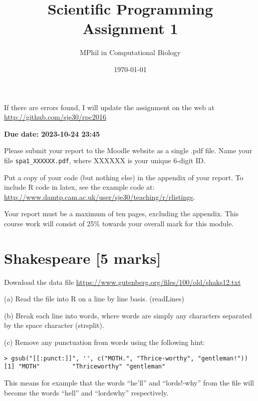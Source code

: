 \documentclass[11pt]{article}\usepackage[]{graphicx}\usepackage[]{color}
\newcommand{\hard}{\textbf{(Advanced:)}\xspace}
\begin{document}
\title{Scientific Programming Assignment 1}
\author{MPhil in Computational Biology}
\date{\today}

\maketitle


If there are errors found, I will update the assignment on the web at\\
\url{http://github.com/sje30/rpc2016}



\textbf{Due date: 2023-10-24 23:45}

Please submit your report to the Moodle website as a single .pdf
file.  Name your file \verb+spa1_XXXXXX.pdf+, where XXXXXX is your
unique 6-digit ID.

Put a copy of your code (but nothing else) in the appendix of your
report.  To include R code in latex, see the example code at:
\url{http://www.damtp.cam.ac.uk/user/sje30/teaching/r/rlistings}.

Your report must be a maximum of ten pages, excluding the appendix.
This course work will consist of 25\% towards your overall mark for
this module.  %





\clearpage


\section{Shakespeare [5 marks]}

Download the data file \url{https://www.gutenberg.org/files/100/old/shaks12.txt}

(a) Read the file into R on a line by line basis.  (readLines)

(b) Break each line into words, where words are simply any characters separated by the space character
(strsplit).

(c) Remove any punctuation from words using the following hint:

\begin{verbatim}
> gsub("[[:punct:]]", '', c("MOTH.", "Thrice-worthy", "gentleman!"))
[1] "MOTH"         "Thriceworthy" "gentleman"   
\end{verbatim}

This means for example that the words ``he'll'' and ``lords!-why''
from the file will become the words ``hell'' and ``lordswhy''
respectively.
\end{document}
